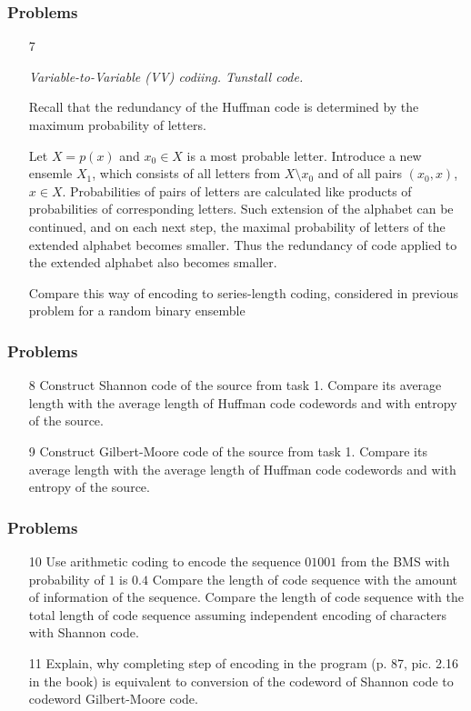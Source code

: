 \documentclass[14pt]{beamer}
\begin{document}
\begin{frame}
\frametitle{Problems}
\begin{enumerate}
  \item[7] 
  \footnotesize { \emph{Variable-to-Variable  (VV) codiing. Tunstall code.}
  
  Recall that the redundancy of the Huffman code is determined by the maximum probability of letters. 
  
  Let $X={p(x)}$ and $x_0\in X$  is a most probable letter. Introduce a new ensemle $X_1$, which consists of all letters from $X\setminus{x_0}$ and of all pairs $(x_0,x)$, $x\in X$. Probabilities of pairs of letters are calculated like products of probabilities of corresponding letters. 
  Such extension of the alphabet can be continued, and on each next step, the maximal probability of letters of the extended alphabet becomes smaller. Thus the redundancy of code applied to the extended alphabet also becomes smaller.

  Compare this way of encoding to series-length coding, considered in previous problem for a random binary ensemble 
 
}
\end{enumerate}
\end{frame}


\begin{frame}
\frametitle{Problems}
\begin{enumerate}
\item[8] Construct Shannon code of the source from task 1. Compare its average length with the average length of Huffman code codewords and with entropy of the source.

\pause \item[9] Construct Gilbert-Moore code of the source from task 1. Compare its average length with the average length of Huffman code codewords and with entropy of the source.

\end{enumerate}
\end{frame}


\begin{frame}
\frametitle{Problems}
\begin{enumerate}

 \item[10] Use arithmetic coding to encode the sequence $01001$ from the BMS with probability of $1$ is $0.4$
 Compare the length of code sequence with the amount of information of the sequence. 
 Compare the length of code sequence with the total length of code sequence assuming independent encoding of characters with Shannon code.
 
\pause \item[11] Explain, why completing step of encoding in the program (p. 87, pic. 2.16 in the book) is equivalent to conversion of the codeword of Shannon code to codeword Gilbert-Moore code.

\end{enumerate}
\end{frame}
\end{document}
